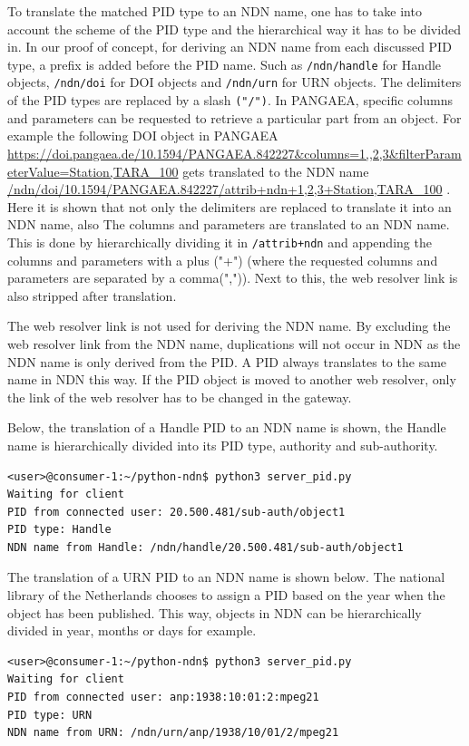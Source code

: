 To translate the matched PID type to an NDN name, one has to take into account the scheme of the PID type and the hierarchical way it has to be divided in. In our proof of concept, for deriving an NDN name from each discussed PID type, a prefix is added before the PID name. Such as \texttt{/ndn/handle} for Handle objects, \texttt{/ndn/doi} for DOI objects and \texttt{/ndn/urn} for URN objects. The delimiters of the PID types are replaced by a slash \texttt{("/")}. In PANGAEA, specific columns and parameters can be requested  to retrieve a particular part from an object. For example the following DOI object in PANGAEA \url{https://doi.pangaea.de/10.1594/PANGAEA.842227&columns=1,,2,3&filterParameterValue=Station,TARA_100} gets translated to the NDN name \url{/ndn/doi/10.1594/PANGAEA.842227/attrib+ndn+1,2,3+Station,TARA_100} \cite{ndn-app-aware}. Here it is shown that not only the delimiters are replaced to translate it into an NDN name, also The columns and parameters are translated to an NDN name. This is done by hierarchically dividing it in \texttt{/attrib+ndn} and appending the columns and parameters with a plus ("+") (where the requested columns and parameters are separated by a comma(",")). Next to this, the web resolver link is also stripped after translation.

The web resolver link is not used for deriving the NDN name.
By excluding the web resolver link from the NDN name, duplications will not occur in NDN as the NDN name is only derived from the PID. A PID always translates to the same name in NDN this way. 
If the PID object is moved to another web resolver, only the link of the web resolver has to be changed in the gateway. 

Below, the translation of a Handle PID to an NDN name is shown, the Handle name is hierarchically divided into its PID type, authority and sub-authority.
\vspace{1em}
\begin{lstlisting}[frame=single,gobble=0,basicstyle=\scriptsize\ttfamily]
<user>@consumer-1:~/python-ndn$ python3 server_pid.py
Waiting for client
PID from connected user: 20.500.481/sub-auth/object1
PID type: Handle
NDN name from Handle: /ndn/handle/20.500.481/sub-auth/object1
\end{lstlisting}

The translation of a URN PID to an NDN name is shown below. The national library of the Netherlands chooses to assign a PID based on the year when the object has been published. 
This way, objects in NDN can be hierarchically divided in year, months or days for example.
\vspace{1em}
\begin{lstlisting}[frame=single,gobble=0,basicstyle=\scriptsize\ttfamily]
<user>@consumer-1:~/python-ndn$ python3 server_pid.py
Waiting for client
PID from connected user: anp:1938:10:01:2:mpeg21
PID type: URN
NDN name from URN: /ndn/urn/anp/1938/10/01/2/mpeg21
\end{lstlisting}

